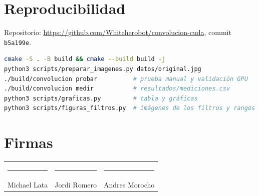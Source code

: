 \documentclass[12pt]{article}
\newcommand{\repo}{\url{https://github.com/Whiteherobot/convolucion-cuda}}
\begin{document}
\section{Reproducibilidad}

Repositorio: \repo, commit \texttt{b5a199e}.

\begin{lstlisting}[language=bash]
cmake -S . -B build && cmake --build build -j
python3 scripts/preparar_imagenes.py datos/original.jpg
./build/convolucion probar          # prueba manual y validación GPU
./build/convolucion medir           # resultados/mediciones.csv
python3 scripts/graficas.py         # tabla y gráficas
python3 scripts/figuras_filtros.py  # imágenes de los filtros y rangos
\end{lstlisting}

\section*{Firmas}
\vspace{2cm}
\noindent
\begin{tabular}{ccc}
\rule{4.3cm}{0.4pt} & \rule{4.3cm}{0.4pt} & \rule{4.3cm}{0.4pt} \\
Michael Lata & Jordi Romero & Andres Morocho \\
\end{tabular}


\newpage


\end{document}
